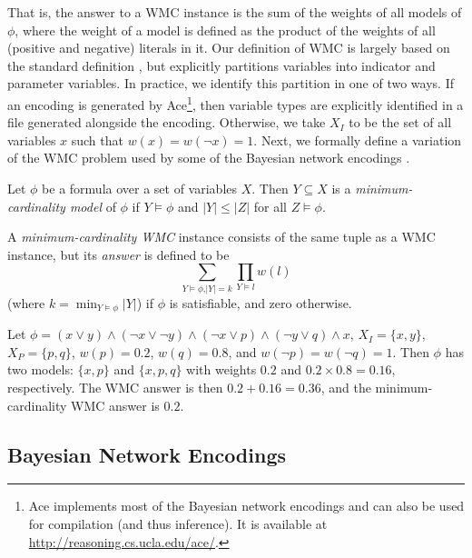 That is, the answer to a WMC instance is the sum of the weights of all models of
$\phi$, where the weight of a model is defined as the product of the weights of
all (positive and negative) literals in it. Our definition of WMC is largely
based on the standard definition \cite{DBLP:journals/ai/ChaviraD08}, but
explicitly partitions variables into indicator and parameter variables. In
practice, we identify this partition in one of two ways. If an encoding is
generated by \textsf{Ace}\footnote{\textsf{Ace}
  \cite{DBLP:journals/ai/ChaviraD08} implements most of the Bayesian network
  encodings and can also be used for compilation (and thus inference). It is
  available at \url{http://reasoning.cs.ucla.edu/ace/}.}, then variable types
are explicitly identified in a file generated alongside the encoding. Otherwise,
we take $X_I$ to be the set of all variables $x$ such that $w(x) = w(\neg x) =
1$. Next, we formally define a variation of the WMC problem used by some of the
Bayesian network encodings
\cite{DBLP:conf/ijcai/ChaviraD05,DBLP:conf/sat/ChaviraD06}.

\begin{definition}
  Let $\phi$ be a formula over a set of variables $X$. Then $Y \subseteq X$ is a
  \emph{minimum-cardinality model} of $\phi$ if $Y \models \phi$ and $|Y| \le
  |Z|$ for all $Z \models \phi$.
\end{definition}

\begin{definition} \label{def:mcwmc}
  A \emph{minimum-cardinality WMC} instance consists of the same tuple as a WMC
  instance, but its \emph{answer} is defined to be
  \[
  \sum_{Y \models \phi\text{,}|Y| = k} \prod_{Y \models l} w(l)
  \]
  (where $k = \min_{Y \models \phi} |Y|$) if $\phi$ is satisfiable, and zero otherwise.
\end{definition}

\begin{example} \label{example:1}
  Let $\phi = (x \lor y) \land (\neg x \lor \neg y) \land (\neg x \lor p) \land
  (\neg y \lor q) \land x$, $X_I = \{ x, y \}$, $X_P = \{ p, q \}$, $w(p) =
  0.2$, $w(q) = 0.8$, and $w(\neg p) = w(\neg q) = 1$. Then $\phi$ has two
  models: $\{x, p\}$ and $\{ x, p, q \}$ with weights $0.2$ and $0.2 \times 0.8
  = 0.16$, respectively. The WMC answer is then $0.2 + 0.16 = 0.36$, and the
  minimum-cardinality WMC answer is $0.2$.
\end{example}

\subsection{Bayesian Network Encodings} \label{sec:encodings}


